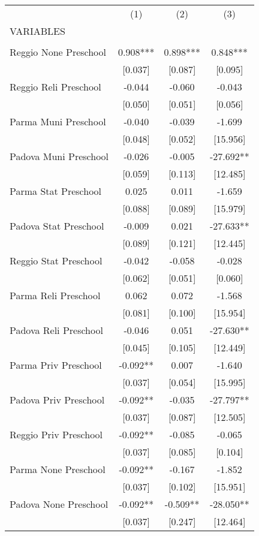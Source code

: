 \begin{tabular}{lccc} \hline
 & (1) & (2) & (3) \\
VARIABLES &  &  &  \\ \hline
 &  &  &  \\
Reggio None Preschool & 0.908*** & 0.898*** & 0.848*** \\
 & [0.037] & [0.087] & [0.095] \\
Reggio Reli Preschool & -0.044 & -0.060 & -0.043 \\
 & [0.050] & [0.051] & [0.056] \\
Parma Muni Preschool & -0.040 & -0.039 & -1.699 \\
 & [0.048] & [0.052] & [15.956] \\
Padova Muni Preschool & -0.026 & -0.005 & -27.692** \\
 & [0.059] & [0.113] & [12.485] \\
Parma Stat Preschool & 0.025 & 0.011 & -1.659 \\
 & [0.088] & [0.089] & [15.979] \\
Padova Stat Preschool & -0.009 & 0.021 & -27.633** \\
 & [0.089] & [0.121] & [12.445] \\
Reggio Stat Preschool & -0.042 & -0.058 & -0.028 \\
 & [0.062] & [0.051] & [0.060] \\
Parma Reli Preschool & 0.062 & 0.072 & -1.568 \\
 & [0.081] & [0.100] & [15.954] \\
Padova Reli Preschool & -0.046 & 0.051 & -27.630** \\
 & [0.045] & [0.105] & [12.449] \\
Parma Priv Preschool & -0.092** & 0.007 & -1.640 \\
 & [0.037] & [0.054] & [15.995] \\
Padova Priv Preschool & -0.092** & -0.035 & -27.797** \\
 & [0.037] & [0.087] & [12.505] \\
Reggio Priv Preschool & -0.092** & -0.085 & -0.065 \\
 & [0.037] & [0.085] & [0.104] \\
Parma None Preschool & -0.092** & -0.167 & -1.852 \\
 & [0.037] & [0.102] & [15.951] \\
Padova None Preschool & -0.092** & -0.509** & -28.050** \\
 & [0.037] & [0.247] & [12.464] \\

\end{tabular}
